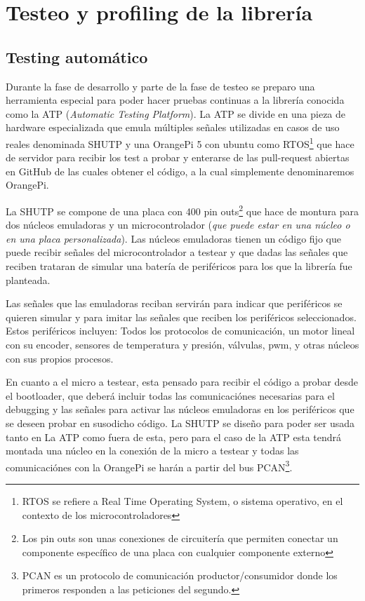 \documentclass{report}
\begin{document}
\section{Testeo y profiling de la librería}
\subsection{Testing automático}
Durante la fase de desarrollo y parte de la fase de testeo se preparo una herramienta especial para poder hacer pruebas continuas a la librería conocida como la ATP (\textit{Automatic Testing Platform}). La ATP se divide en una pieza de hardware especializada que emula múltiples señales utilizadas en casos de uso reales denominada SHUTP y una OrangePi 5 con ubuntu como RTOS\footnote{RTOS se refiere a Real Time Operating System, o sistema operativo, en el contexto de los microcontroladores} que hace de servidor para recibir los test a probar y enterarse de las pull-request abiertas en GitHub de las cuales obtener el código, a la cual simplemente denominaremos OrangePi. \par \vspace{0.3cm}

La SHUTP se compone de una placa con 400 pin outs\footnote{Los pin outs son unas conexiones de circuitería que permiten conectar un componente específico de una placa con cualquier componente externo} que hace de montura para dos núcleos emuladoras y un microcontrolador (\textit{que puede estar en una núcleo o en una placa personalizada}). Las núcleos emuladoras tienen un código fijo que puede recibir señales del microcontrolador a testear y que dadas las señales que reciben trataran de simular una batería de periféricos para los que la librería fue planteada. \par
Las señales que las emuladoras reciban servirán para indicar que periféricos se quieren simular y para imitar las señales que reciben los periféricos seleccionados. Estos periféricos incluyen: Todos los protocolos de comunicación, un motor lineal con su encoder, sensores de temperatura y presión, válvulas, pwm, y otras núcleos con sus propios procesos. \par
En cuanto a el micro a testear, esta pensado para recibir el código a probar desde el bootloader, que deberá incluir todas las comunicaciónes necesarias para el debugging y las señales para activar las núcleos emuladoras en los periféricos que se deseen probar en susodicho código. La SHUTP se diseño para poder ser usada tanto en La ATP como fuera de esta, pero para el caso de la ATP esta tendrá montada una núcleo en la conexión de la micro a testear y todas las comunicaciónes con la OrangePi se harán a partir del bus PCAN\footnote{PCAN es un protocolo de comunicación productor/consumidor donde los primeros responden a las peticiones del segundo.}.
\par \vspace{0.3cm}
\end{document}
